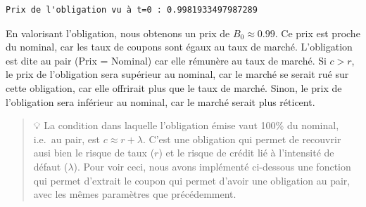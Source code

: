 \documentclass[
  letterpaper,
  DIV=11,
  numbers=noendperiod]{scrartcl}
\begin{document}
\begin{verbatim}
Prix de l'obligation vu à t=0 : 0.9981933497987289
\end{verbatim}

En valorisant l'obligation, nous obtenons un prix de
\(B_0 \approx 0.99\). Ce prix est proche du nominal, car les taux de
coupons sont égaux au taux de marché. L'obligation est dite au pair
(Prix = Nominal) car elle rémunère au taux de marché. Si \(c > r\), le
prix de l'obligation sera supérieur au nominal, car le marché se serait
rué sur cette obligation, car elle offrirait plus que le taux de marché.
Sinon, le prix de l'obligation sera inférieur au nominal, car le marché
serait plus réticent.

\begin{quote}
💡 La condition dans laquelle l'obligation émise vaut 100\% du nominal,
i.e.~au pair, est \(c \approx r + \lambda\). C'est une obligation qui
permet de recouvrir ausi bien le risque de taux (\(r\)) et le risque de
crédit lié à l'intensité de défaut (\(\lambda\)). Pour voir ceci, nous
avons implémenté ci-dessous une fonction qui permet d'extrait le coupon
qui permet d'avoir une obligation au pair, avec les mêmes paramètres que
précédemment.
\end{quote}
\end{document}
